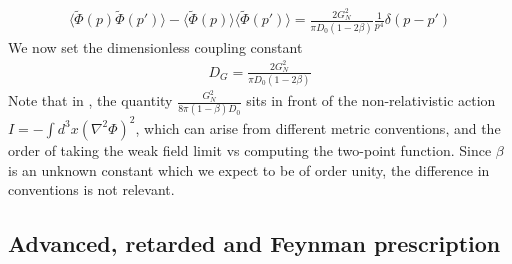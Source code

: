 \documentclass[aps,preprintnumbers,superscriptaddress,longbibliography]{revtex4-1}
\begin{document}
\begin{align}
    \langle \tilde{\Phi}(p) \tilde{\Phi}(p')\rangle-\langle \tilde{\Phi}{(p)}\rangle\langle \tilde{\Phi}(p')\rangle=\frac{2G_N^2}{\pi D_0(1-2\beta)}\frac{1}{p^4}\delta(p-p')
\end{align}
We now set the dimensionless coupling constant
\begin{align}
    D_G=\frac{2G_N^2}{\pi D_0(1-2\beta)}
    \label{eq:Dg}
\end{align}
Note that in \cite{layton2023weak,UCLDMDNE}, the quantity $\frac{G_N^2}{8\pi(1-\beta) D_0}$ sits in front of the non-relativistic action $I=- \int d^3x (\nabla^2\Phi)^2$, which can arise from different metric conventions, and the order of taking the weak field limit vs computing the two-point function. Since $\beta$ is an unknown constant which we expect to be of order unity, the difference in conventions is not relevant. 



\subsection{Advanced, retarded and Feynman prescription}
\label{ss:gfuncs}
\end{document}
